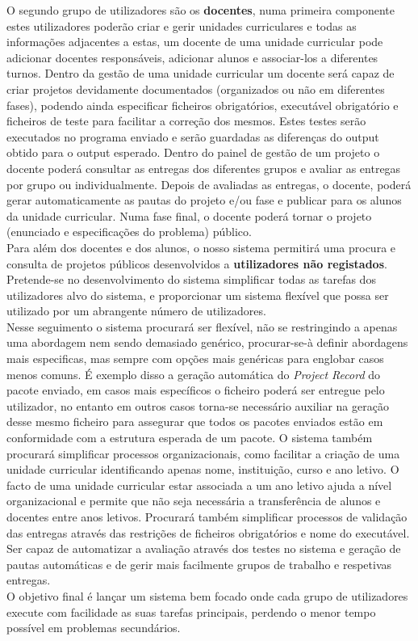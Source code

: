 O segundo grupo de utilizadores são os \textbf{docentes}, numa primeira componente estes utilizadores poderão criar e gerir unidades curriculares e todas as informações adjacentes a estas, um docente de uma unidade curricular pode adicionar docentes responsáveis, adicionar alunos e associar-los a diferentes turnos. Dentro da gestão de uma unidade curricular um docente será capaz de criar projetos devidamente documentados (organizados ou não em diferentes fases), podendo ainda especificar ficheiros obrigatórios, executável obrigatório e ficheiros de teste para facilitar a correção dos mesmos. Estes testes serão executados no programa enviado e serão guardadas as diferenças do output obtido para o output esperado. Dentro do painel de gestão de um projeto o docente poderá consultar as entregas dos diferentes grupos e avaliar as entregas por grupo ou individualmente. Depois de avaliadas as entregas, o docente, poderá gerar automaticamente as pautas do projeto e/ou fase e publicar para os alunos da unidade curricular.
Numa fase final, o docente poderá tornar o projeto (enunciado e especificações do problema) público.\\

Para além dos docentes e dos alunos, o nosso sistema permitirá uma procura e consulta de projetos públicos desenvolvidos a \textbf{utilizadores não registados}.\\

Pretende-se no desenvolvimento do sistema simplificar todas as tarefas dos utilizadores alvo do sistema, e proporcionar um sistema flexível que possa ser utilizado por um abrangente número de utilizadores.\\

Nesse seguimento o sistema procurará ser flexível, não se restringindo a apenas uma abordagem nem sendo demasiado genérico, procurar-se-à definir abordagens mais especificas, mas sempre com opções mais genéricas para englobar casos menos comuns. É exemplo disso a geração automática do \textit{Project Record} do pacote enviado, em casos mais específicos o ficheiro poderá ser entregue pelo utilizador, no entanto em outros casos torna-se necessário auxiliar na geração desse mesmo ficheiro para assegurar que todos os pacotes enviados estão em conformidade com a estrutura esperada de um pacote. O sistema também procurará simplificar processos organizacionais, como facilitar a criação de uma unidade curricular identificando apenas nome, instituição, curso e ano letivo. O facto de uma unidade curricular estar associada a um ano letivo ajuda a nível organizacional e permite que não seja necessária a transferência de alunos e docentes entre anos letivos. Procurará também simplificar processos de validação das entregas através das restrições de ficheiros obrigatórios e nome do executável. Ser capaz de automatizar a avaliação através dos testes no sistema e geração de pautas automáticas e de gerir mais facilmente grupos de trabalho e respetivas entregas.\\

O objetivo final é lançar um sistema bem focado onde cada grupo de utilizadores execute com facilidade as suas tarefas principais, perdendo o menor tempo possível em problemas secundários. 
